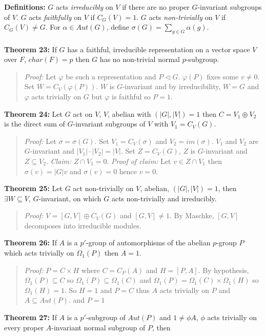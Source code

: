{\bf Definitions:} $G$ acts \emph{irreducibly} on $V$  if there are no proper $G$-invariant
subgroups of $V$.  
$G$ acts \emph{faithfully} on $V$ if $C_G(V) = 1$.
$G$ acts \emph{non-trivially} on $V$ if $C_G(V) \ne G$.
For $\alpha \in Aut(G)$, define $\sigma(G)= \sum_{g \in G} \alpha(g)$.
\\
\\
{\bf Theorem 23:}
If $G$ has a faithful, irreducible representation on a vector space $V$ over $F$,
$char(F) = p$ then $G$ has no non-trivial normal $p$-subgroup.
\begin{quote}
\emph{Proof:}  
Let $\varphi$ be such a representation and $P \lhd G$.  $\varphi(P)$ fixes some
$v \ne 0$.  Set $W= C_V(\varphi(P))$.  $W$ is $G$-invariant and by irreducibility,
$W=G$ and $\varphi$ acts trivially on $G$ but $\varphi$ is faithful so
$P= 1$.
\end{quote}
{\bf Theorem 24:}
Let $G$ act on $V$, $V$, abelian with $(|G|, |V|)= 1$ then $C = V_1 \oplus V_2$ is the
direct sum of $G$-invariant subgroups of $V$ with $V_1= C_V(G)$.
\begin{quote}
\emph{Proof:}  
Let $\sigma= \sigma(G)$.  Set $V_1 = C_V(\sigma)$ and $V_2= im(\sigma)$. $V_1$ and 
$V_2$ are $G$-invariant and $|V_1| \cdot |V_2| = |V|$.  Set $Z= C_V(G)$, $Z$ is $G$-invariant
and $Z \subseteq V_2$.   \emph{Claim:} $Z \cap V_1 = 0$.  \emph{Proof of claim:}
Let $v \in Z \cap V_1$ then $\sigma(v)= |G|v$ and $\sigma(v)= 0$ hence $v= 0$.
\end{quote}
{\bf Theorem 25:}
Let $G$ act non-trivially on $V$, abelian, $(|G|, |V|)=1$, then $\exists W \subseteq V$,
$G$-invariant, on which $G$ acts non-trivially and irreducibly.
\begin{quote}
\emph{Proof:}
$V= [G,V] \oplus C_V(G)$ and $[G,V] \ne 1$.  By Maschke, $[G,V]$ decomposes into
irreducible modules.
\end{quote}
{\bf Theorem 26:}
If $A$ is a $p'$-group of automorphisms of the abelian $p$-group $P$ which
acts trivially on $\Omega_1(P)$ then $A= 1$.
\begin{quote}
\emph{Proof:}  
$P= C \times H$ where $C= C_P(A)$ and $H= [P, A]$.  By hypothesis,
$\Omega_1(P) \subseteq C$ so $\Omega_1(P) \subseteq \Omega_1(C)$ and
$\Omega_1(P) = \Omega_1(C) \times \Omega_1(H)$ so $\Omega_1(H) = 1$.
So $H = 1$ and $P= C$  thus $A$ acts trivially on $P$ and $A \subseteq Aut(P)$.
and $P = 1$
\end{quote}
{\bf Theorem 27:}
If $A$ is a $p'$-subgroup of $Aut(P)$ and $1 \ne \phi A$, $\phi$ acts trivially
on every proper $A$-invariant normal subgroup of $P$, then

